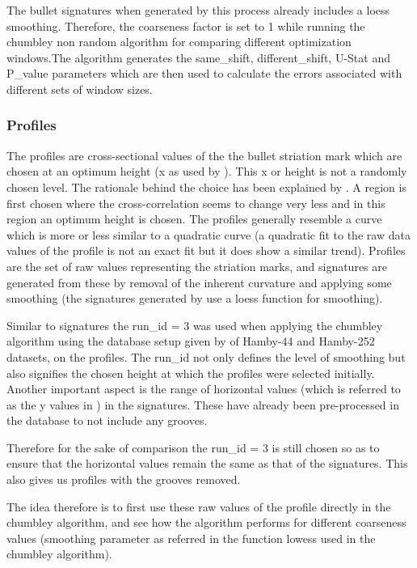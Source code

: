 \documentclass[12pt]{article}
\begin{document}
The bullet signatures when generated by this process already includes a
loess smoothing. Therefore, the coarseness factor is set to 1 while
running the chumbley non random algorithm for comparing different
optimization windows.The algorithm generates the same\_shift,
different\_shift, U-Stat and P\_value parameters which are then used to
calculate the errors associated with different sets of window sizes.

\subsubsection{Profiles}\label{profiles}

The profiles are cross-sectional values of the the bullet striation mark
which are chosen at an optimum height (x as used by \citet{aoas}). This
x or height is not a randomly chosen level. The rationale behind the
choice has been explained by \citet{aoas}. A region is first chosen
where the cross-correlation seems to change very less and in this region
an optimum height is chosen. The profiles generally resemble a curve
which is more or less similar to a quadratic curve (a quadratic fit to
the raw data values of the profile is not an exact fit but it does show
a similar trend). Profiles are the set of raw values representing the
striation marks, and signatures are generated from these by removal of
the inherent curvature and applying some smoothing (the signatures
generated by \citet{aoas} use a loess function for smoothing).

Similar to signatures the run\_id = 3 was used when applying the
chumbley algorithm using the database setup given by \citet{aoas} of
Hamby-44 and Hamby-252 datasets, on the profiles. The run\_id not only
defines the level of smoothing but also signifies the chosen height at
which the profiles were selected initially. Another important aspect is
the range of horizontal values (which is referred to as the y values in
\citet{aoas}) in the signatures. These have already been pre-processed
in the database to not include any grooves.

Therefore for the sake of comparison the run\_id = 3 is still chosen so
as to ensure that the horizontal values remain the same as that of the
signatures. This also gives us profiles with the grooves removed.

The idea therefore is to first use these raw values of the profile
directly in the chumbley algorithm, and see how the algorithm performs
for different coarseness values (smoothing parameter as referred in the
function lowess used in the chumbley algorithm).
\end{document}
